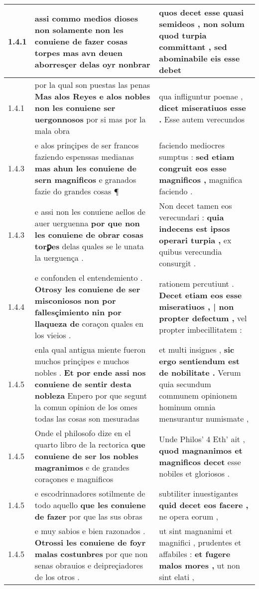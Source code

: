 \begin{tabular}{|p{1cm}|p{6.5cm}|p{6.5cm}|}
1.4.1 & assi commo medios dioses \textbf{ non solamente non les conuiene de fazer cosas torpes } mas avn deuen aborresçer delas oyr nonbrar & quos decet esse quasi semideos , \textbf{ non solum quod turpia committant , } sed abominabile eis esse debet \\\hline
1.4.1 & por la qual son puestas las penas \textbf{ Mas alos Reyes e alos nobles non les conuiene ser uergonnosos } por si mas por la mala obra & qua infliguntur poenae , \textbf{ dicet miseratiuos esse . } Esse autem verecundos \\\hline
1.4.3 & e alos prinçipes de ser francos faziendo espenssas medianas \textbf{ mas ahun les conuiene de sern magnificos } e granados fazie do grandes cosas ¶ & faciendo mediocres sumptus : \textbf{ sed etiam congruit eos esse magnificos , } magnifica faciendo . \\\hline
1.4.3 & e assi non les conuiene aellos de auer uerguenna \textbf{ por que non les conuiene de obrar cosas torꝑes } delas quales se le unata la uerguença . & Non decet tamen eos verecundari : \textbf{ quia indecens est ipsos operari turpia , } ex quibus verecundia consurgit . \\\hline
1.4.4 & e confonden el entendemiento . \textbf{ Otrosy les conuiene de ser misconiosos non por fallesçimiento nin por llaqueza de } coraçon quales en los vieios . & rationem percutiunt . \textbf{ Decet etiam eos esse miseratiuos , | non propter defectum , } vel propter imbecillitatem : \\\hline
1.4.5 & enla qual antigua miente fueron muchos prinçipes e muchos nobles . \textbf{ Et por ende assi nos conuiene de sentir desta nobleza } Enpero por que segunt la comun opinion de los omes todas las cosas son mesuradas & et multi insignes , \textbf{ sic ergo sentiendum est de nobilitate . } Verum quia secundum communem opinionem hominum omnia mensurantur numismate , \\\hline
1.4.5 & Onde el philosofo dize en el quarto libro de la rectorica \textbf{ que conuiene de ser los nobles magranimos } e de grandes coraçones e magnificos & Unde Philos’ 4 Eth’ ait , \textbf{ quod magnanimos et magnificos decet } esse nobiles et gloriosos . \\\hline
1.4.5 & e escodrinnadores sotilmente de todo aquello \textbf{ que les conuiene de fazer } por que las sus obras & subtiliter inuestigantes \textbf{ quid decet eos facere , } ne opera eorum , \\\hline
1.4.5 & e muy sabios e bien razonados . \textbf{ Otrossi les conuiene de foyr malas costunbres } por que non senas obrauios e deipreçiadores de los otros . & ut sint magnanimi et magnifici , prudentes et affabiles : \textbf{ et fugere malos mores , } ut non sint elati , \\\hline

\end{tabular}
